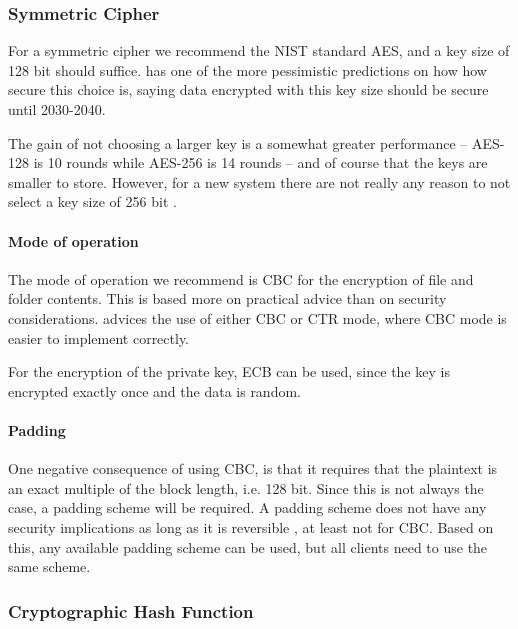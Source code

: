 \documentclass[pdftex,english,10pt,b5paper,twoside]{book}
\begin{document}
\subsubsection{Symmetric Cipher}

For a symmetric cipher we recommend the \ac{NIST} standard \ac{AES}, and a key
size of 128 bit should suffice.  \cite{ecrypt2_2010}
has one of the more pessimistic predictions on how how secure this choice is,
saying data encrypted with this key size should be secure until 2030-2040. 

The gain of not choosing a larger key is a somewhat greater performance --
\ac{AES}-128 is 10 rounds while \ac{AES}-256 is 14 rounds -- and of course that
the keys are smaller to store. However, for a new system there are not really
any reason to not select a key size of 256 bit \cite{schneier}.

\paragraph{Mode of operation} The mode of operation we recommend is \ac{CBC}
for the encryption of file and folder contents.  This is based more on
practical advice than on security considerations.  \citet{schneier} advices the
use of either \ac{CBC} or \ac{CTR} mode, where \ac{CBC} mode is easier to
implement correctly. 

For the encryption of the private key, \ac{ECB} can be used, since the key is
encrypted exactly once and the data is random.


\paragraph{Padding} One negative consequence of using \ac{CBC}, is that it
requires that the plaintext is an exact multiple of the block length, i.e.  128
bit. Since this is not always the case, a padding scheme will be required.  A
padding scheme does not have any security implications as long as it is
reversible \cite{schneier}, at least not for \ac{CBC}. Based on this, any
available padding scheme can be used, but all clients need to use the same
scheme.

\subsubsection{Cryptographic Hash Function}
\end{document}
